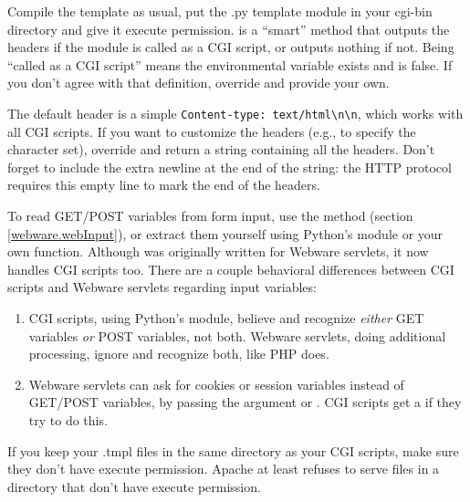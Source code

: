 Compile the template as usual, put the .py template module in your
cgi-bin directory and give it execute permission.   is
a ``smart'' method that outputs the headers if the module is called as a
CGI script, or outputs nothing if not.  Being ``called as a CGI script''
means the environmental variable  exists and
 is false.  If you don't agree with that
definition, override  and provide your own.  

The default header is a simple \verb+Content-type: text/html\n\n+, which works
with all CGI scripts.  If you want to customize the headers (e.g., to 
specify the character set), override  and return
a string containing all the headers.  Don't forget to include the extra
newline at the end of the string: the HTTP protocol requires this empty
line to mark the end of the headers.

To read GET/POST variables from form input, use the  method
(section \ref{webware.webInput}), or extract them yourself using Python's
 module or your own function.  Although  was
originally written for Webware servlets, it now handles CGI scripts too.  There
are a couple behavioral differences between CGI scripts and Webware servlets
regarding input variables:

\begin{enumerate}
\item CGI scripts, using Python's  module, believe
     and recognize {\em either} GET variables {\em or}
    POST variables, not both.  Webware servlets, doing additional processing,
    ignore  and recognize both, like PHP does.
\item Webware servlets can ask for cookies or session variables instead of
    GET/POST variables, by passing the argument  or
    .  CGI scripts get a  if they try to do
    this.  
\end{enumerate}

If you keep your .tmpl files in the same directory as your CGI scripts, make
sure they don't have execute permission.  Apache at least refuses to serve
files in a  directory that don't have execute permission.


